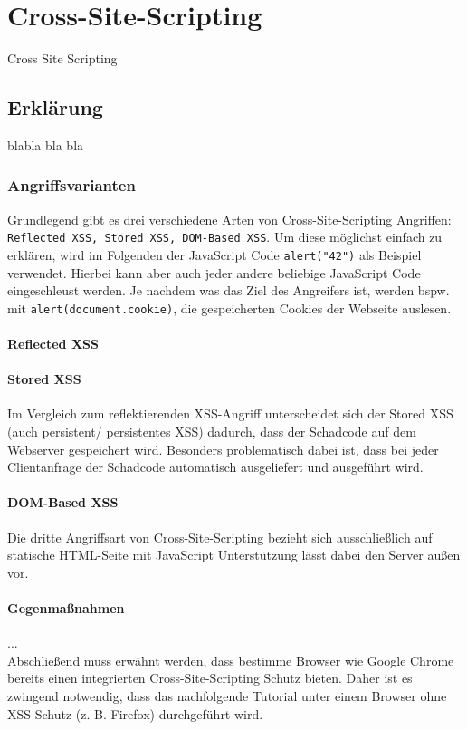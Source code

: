 \chapter{Cross-Site-Scripting}
\label{XSS}
Cross Site Scripting
\section{Erklärung}
blabla bla bla \\ 

\subsection{Angriffsvarianten}
Grundlegend gibt es drei verschiedene Arten von Cross-Site-Scripting Angriffen: \colorbox{altgray}{\lstinline|Reflected XSS, Stored XSS, DOM-Based XSS|}. Um diese möglichst einfach zu erklären, wird im Folgenden der JavaScript Code \colorbox{altgray}{\lstinline|alert("42")|} als Beispiel verwendet. Hierbei kann aber auch jeder andere beliebige JavaScript Code eingeschleust werden. Je nachdem was das Ziel des Angreifers ist, werden bspw. mit \colorbox{altgray}{\lstinline|alert(document.cookie)|}, die gespeicherten Cookies der Webseite auslesen. \\ 
\subsubsection*{Reflected XSS}
\subsubsection*{Stored XSS}
Im Vergleich zum reflektierenden XSS-Angriff unterscheidet sich der Stored XSS (auch persistent/ persistentes XSS) dadurch, dass der Schadcode auf dem Webserver gespeichert wird. Besonders problematisch dabei ist, dass bei jeder Clientanfrage der Schadcode automatisch ausgeliefert und ausgeführt wird. \\ 
\subsubsection*{DOM-Based XSS}
Die dritte Angriffsart von Cross-Site-Scripting bezieht sich ausschließlich auf statische HTML-Seite mit JavaScript Unterstützung lässt dabei den Server außen vor. 
\subsubsection{Gegenmaßnahmen}
... \\ 
Abschließend muss erwähnt werden, dass bestimme Browser wie Google Chrome bereits einen integrierten Cross-Site-Scripting Schutz bieten. Daher ist es zwingend notwendig, dass das nachfolgende Tutorial unter einem Browser ohne XSS-Schutz (z. B. Firefox) durchgeführt wird. 

